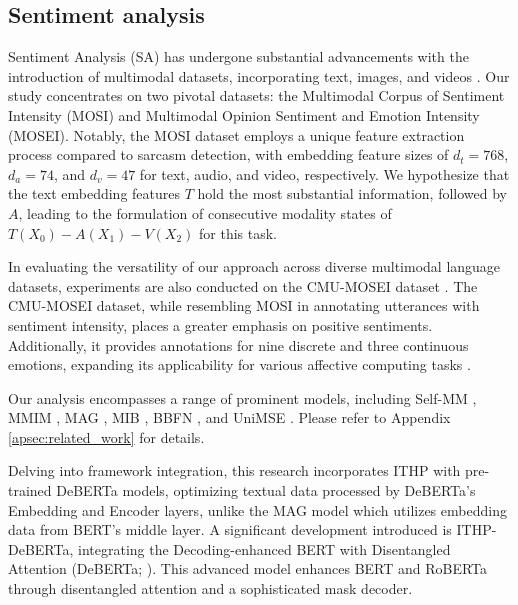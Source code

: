 \documentclass{article} %
\begin{document}
\subsection{Sentiment analysis}

Sentiment Analysis (SA) has undergone substantial advancements with the introduction of multimodal datasets, incorporating text, images, and videos \cite{gandhi2022multimodal}. Our study concentrates on two pivotal datasets: the Multimodal Corpus of Sentiment Intensity (MOSI) and Multimodal Opinion Sentiment and Emotion Intensity (MOSEI). Notably, the MOSI dataset employs a unique feature extraction process compared to sarcasm detection, with embedding feature sizes of $d_t=768$, $d_a=74$, and $d_v=47$ for text, audio, and video, respectively. We hypothesize that the text embedding features $T$ hold the most substantial information, followed by $A$, leading to the formulation of consecutive modality states of $T (X_0)- A (X_1) - V (X_2)$ for this task.  

In evaluating the versatility of our approach across diverse multimodal language datasets, experiments are also conducted on the CMU-MOSEI dataset \citep{zadeh2018multimodal}. The CMU-MOSEI dataset, while resembling MOSI in annotating utterances with sentiment intensity, places a greater emphasis on positive sentiments. Additionally, it provides annotations for nine discrete and three continuous emotions, expanding its applicability for various affective computing tasks \cite{das2023multimodal, liang2023multiviz}. 


Our analysis encompasses a range of prominent models, including Self-MM \citep{yu2021learning}, MMIM \citep{han2021improving}, MAG \citep{rahman2020integrating}, MIB \citep{mai2022multimodal}, BBFN \citep{han2021bi}, and UniMSE \citep{hu2022unimse}. Please refer to Appendix \ref{apsec:related_work} for details.

Delving into framework integration, this research incorporates ITHP with pre-trained DeBERTa models, optimizing textual data processed by DeBERTa's Embedding and Encoder layers, unlike the MAG model which utilizes embedding data from BERT’s middle layer. A significant development introduced is ITHP-DeBERTa, integrating the Decoding-enhanced BERT with Disentangled Attention (DeBERTa; \citealp{he2020deberta, he2021debertav3}). This advanced model enhances BERT and RoBERTa \citep{liu2019roberta} through disentangled attention and a sophisticated mask decoder.
\end{document}
